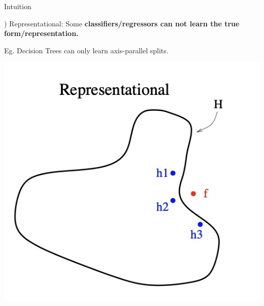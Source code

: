 \documentclass{beamer}
\begin{document}
\begin{frame}{Intuition}

  ) Representational: Some \textbf{classifiers/regressors can not learn the true form/representation.}

  \pause Eg. Decision Trees can only learn axis-parallel splits.

  \includegraphics[scale=0.2]{../assets/ensemble/diagrams/representational.jpg}


\end{frame}
\end{document}

